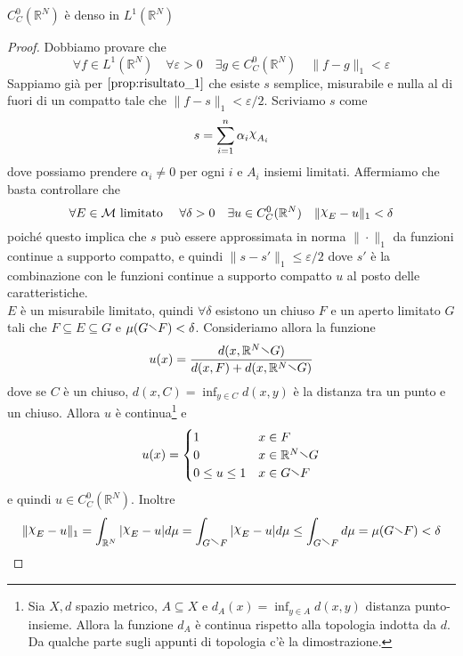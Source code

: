 \begin{proposition}\label{prop:risultato_2}
    \(C_C^{0}{(\mathbb{R}^{N})}\) è denso in \(L^1(\mathbb{R}^{N})\)
\end{proposition}
\begin{proof}
    Dobbiamo provare che 
    \[
        \forall f \in L^1(\mathbb{R}^{N}) \quad \forall \varepsilon > 0 \quad \exists g \in C_C^{0}{(\mathbb{R}^{N})} \quad \|f - g\|_1 < \varepsilon
    \]
    Sappiamo già per \(\ref{prop:risultato_1}\) che esiste \(s\) semplice, misurabile e nulla al di fuori di un
    compatto tale che \(\|f - s\|_1 < \varepsilon/2\). Scriviamo \(s\) come
    \[
        s = \sum_{i=1}^{n} \alpha_i \rchi_{A_i}
    \]
    dove possiamo prendere \(\alpha_{i} \neq 0\) per ogni \(i\) e \(A_{i}\)
    insiemi limitati. Affermiamo che basta controllare che 
    \[
        \forall E \in \mathcal{M} \text{ limitato } \quad \forall \delta > 0
        \quad \exists u \in C_C^{0}{(\mathbb{R}^{N})} \quad \|\rchi_E - u\|_1 < \delta
    \]
    poiché questo implica che \(s\) può essere approssimata in norma \(\|\cdot\|_1\) da funzioni continue a supporto compatto, 
    e quindi \(\| s - s'\|_1 \le \varepsilon/2\) dove \(s'\) è la combinazione con le funzioni continue a supporto compatto \(u\) 
    al posto delle caratteristiche. \\
    \(E\)  è un misurabile limitato, quindi \(\forall \delta\) esistono un
    chiuso \(F\) e un aperto limitato \(G\) tali che \(F \subseteq E \subseteq G \) e
    \(\mu {( G \sminus F )} < \delta\). Consideriamo allora la funzione 
    \[
        u{(x)} = \frac{d{(x, \mathbb{R}^{N} \sminus G)}}{d{(x, F)} + d{(x, \mathbb{R}^{N} \sminus G)}}
    \]
    dove se \(C\) è un chiuso, \(d{(x, C)} = \inf_{y \in C} d{(x, y)}\) è la
    distanza tra un punto e un chiuso. Allora \(u\) è continua\footnote{
        Sia \(X, d\) spazio metrico, \(A \subseteq X \) e \(d_A{(x)} = \inf_{y
        \in A} d(x, y)\) distanza punto-insieme. Allora la funzione \(d_A\) è
        continua rispetto alla topologia indotta da \(d\). Da qualche parte
        sugli appunti di topologia c'è la dimostrazione.
    } e
    \[
        u{(x)} = \begin{cases}
            1 & x \in F  \\
            0 & x \in \mathbb{R}^{N} \sminus G \\
            0 \le u \le 1 & x \in G \sminus F
        \end{cases}
    \]
    e quindi \(u \in C_C^{0}{(\mathbb{R}^{N})}\). Inoltre
    \[
        \|\rchi_E - u\|_1 = \int_{\mathbb{R}^{N}} |\rchi_E - u| d\mu = \int_{G
        \sminus F} |\rchi_E - u| d\mu \le \int_{G \sminus F} d\mu =\mu{(G \sminus F)}< \delta 
    \]
\end{proof}

